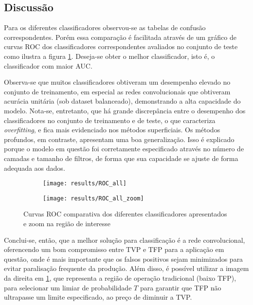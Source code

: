 \begin{table}[h!]

\end{table}


\subsection{Discussão}
Para os diferentes classificadores observou-se as tabelas de confusão correspondentes. Porém essa comparação é facilitada através de um gráfico de curvas ROC dos classificadores correspondentes avaliados no conjunto de teste como ilustra a figura \ref{fig:ROC}. Deseja-se obter o melhor classificador, isto é, o classificador com maior AUC. 

Observa-se que muitos classificadores obtiveram um desempenho elevado no conjunto de treinamento, em especial as redes convolucionais que obtiveram acurácia unitária (sob dataset balanceado), demonstrando a alta capacidade do modelo. Nota-se, entretanto, que há grande discrepância entre o desempenho dos classificadores no conjunto de treinamento e de teste, o que caracteriza \textit{overfitting}, e fica mais evidenciado nos métodos superficiais. Os métodos profundos, em contraste, apresentam uma boa generalização. Isso é explicado porque o modelo em questão foi corretamente especificado através no número de camadas e tamanho de filtros, de forma que sua capacidade se ajuste de forma adequada aos dados.

\begin{figure}[ht]
\centering
\begin{subfigure}{.5\textwidth}
  \centering
  \texttt{[image: results/ROC\_all]}
\end{subfigure}%
\begin{subfigure}{.5\textwidth}
  \centering
  \texttt{[image: results/ROC\_all\_zoom]}
\end{subfigure}
\caption{Curvas ROC comparativa dos diferentes classificadores apresentados e zoom na região de interesse}
\label{fig:ROC}
\end{figure}

Conclui-se, então, que a melhor solução para classificação é a rede convolucional, oferencendo um bom compromisso entre TVP e TFP para a aplicação em questão, onde é mais importante que os falsos positivos sejam minimizados para evitar paralisação frequente da produção. Além disso, é possível utilizar a imagem da direita em \ref{fig:ROC}, que representa a região de operação tradicional (baixo TFP), para selecionar um limiar de probabilidade $T$ para garantir que TFP não ultrapasse um limite especificado, ao preço de diminuir a TVP.

